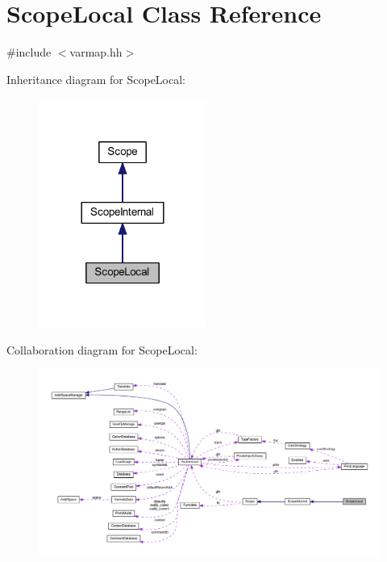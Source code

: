 \hypertarget{class_scope_local}{}\section{Scope\+Local Class Reference}
\label{class_scope_local}


{\ttfamily \#include $<$varmap.\+hh$>$}



Inheritance diagram for Scope\+Local\+:
\nopagebreak
\begin{figure}[H]
\begin{center}
\leavevmode
\includegraphics[width=156pt]{class_scope_local__inherit__graph}
\end{center}
\end{figure}


Collaboration diagram for Scope\+Local\+:
\nopagebreak
\begin{figure}[H]
\begin{center}
\leavevmode
\includegraphics[width=350pt]{class_scope_local__coll__graph}
\end{center}
\end{figure}
